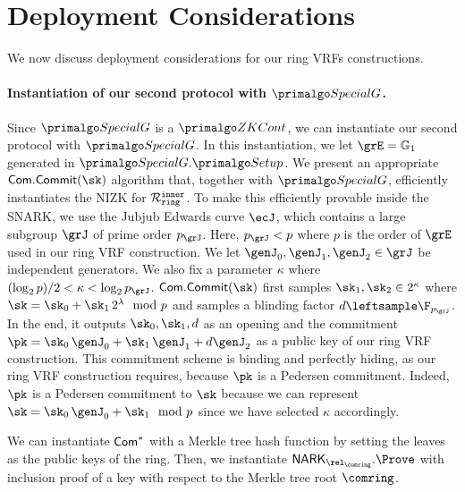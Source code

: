 
\section{Deployment Considerations}\label{sec:deployment}

We now discuss deployment considerations for our ring VRFs constructions.

\paragraph{Instantiation of our second protocol with $ \SpecialG $.} Since $ \SpecialG $ is a $ \ZKCont $, we can instantiate our second protocol with $ \SpecialG$. In this instantiation, we let $ \GG = \grone $ generated in $ \SpecialG.\Setup $.  
We present an appropriate $ \mathsf{Com}.\mathsf{Commit}(\sk) $ algorithm that, together with $ \SpecialG $, efficiently instantiates the NIZK for $ \mathcal{R}_{\mathtt{ring}}^{\mathtt{inner}} $. To make this efficiently provable inside the SNARK,  we use the Jubjub Edwards curve $\ecJ$, which contains a large subgroup $\grJ$ of prime order $p_\grJ$. Here, $p_\grJ < p$ where $ p $ is the order of $\grE$ used in our ring VRF construction. We let $\genJ_0,\genJ_1,\genJ_2 \in \grJ$ be independent generators. We also fix a parameter $ \kappa $ where $(\log_2 p)/2 < \kappa < \log_2 p_\grJ$. $ \mathsf{Com}.\mathsf{Commit}(\sk) $ first samples $\sk_1,\sk_2 \in 2^\kappa$  where $\sk = \sk_0 + \sk_1 \, 2^{\lambda} \mod p$ and samples a blinding factor $d \leftsample \F_{p_\grJ} $. In the end, it outputs $ \sk_0, \sk_1,d $ as an opening and the commitment $\pk=\sk_0\, \genJ_0 + \sk_1\, \genJ_1 + d \genJ_2$ as a public key of our ring VRF construction. This commitment scheme is binding and perfectly hiding, as our ring VRF construction requires, because $ \pk $ is a Pedersen commitment. Indeed, $\pk$ is a Pedersen commitment to $\sk$ because we can represent $ \sk = \sk_0\, \genJ_0 + \sk_1 \mod p$ since we have selected $ \kappa $ accordingly.

We can instantiate $ \mathsf{Com}^*$ with a Merkle tree hash function by setting the leaves as the public keys of the ring. Then, we instantiate $ \NARK_{\relcomring}.\Prove $ with inclusion proof of a key with respect to the Merkle tree root $ \comring $.

